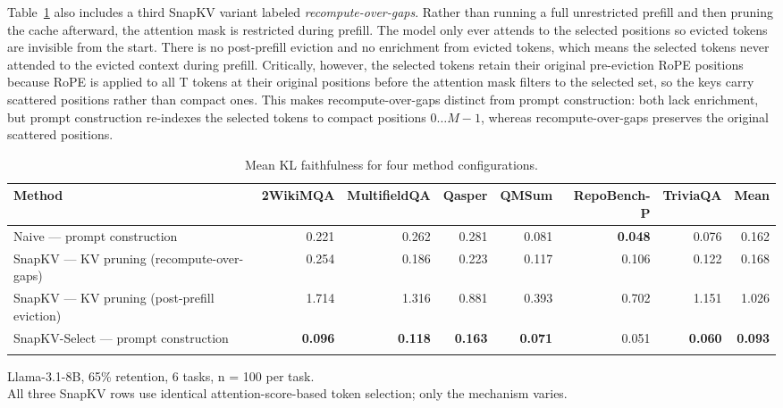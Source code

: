 \documentclass[10pt,letterpaper]{article}
\begin{document}
Table~\ref{tab:t1} also includes a third SnapKV
variant labeled \emph{recompute-over-gaps}. Rather than running a full
unrestricted prefill and then pruning the cache afterward, the attention
mask is restricted during prefill. The model only ever attends to the
selected positions so evicted tokens are invisible from the start.
There is no post-prefill eviction and no enrichment from evicted tokens,
which means the selected tokens never attended to the evicted context during
prefill. Critically, however, the selected tokens retain their original
pre-eviction RoPE positions because RoPE is applied to all T tokens at their
original positions before the attention mask filters to the selected
set, so the keys carry scattered positions rather than compact ones.
This makes recompute-over-gaps distinct from prompt construction: both
lack enrichment, but prompt construction re-indexes the selected tokens
to compact positions \(0 \ldots M-1\), whereas recompute-over-gaps
preserves the original scattered positions.
\begin{table}[H]
\centering
\small
\caption{Mean KL faithfulness for four method configurations.}
\label{tab:t1}
\begin{tabular}{@{}>{\raggedright\arraybackslash}p{}rrrrrrr@{}}
\toprule
Method & 2WikiMQA & MultifieldQA & Qasper & QMSum & RepoBench-P & TriviaQA & Mean\\
\midrule
Naive --- prompt construction & 0.221 & 0.262 & 0.281 & 0.081 & \textbf{0.048} & 0.076 & 0.162\\
SnapKV --- KV pruning (recompute-over-gaps) & 0.254 & 0.186 & 0.223 & 0.117 & 0.106 & 0.122 & 0.168\\
SnapKV --- KV pruning (post-prefill eviction) & 1.714 & 1.316 & 0.881 & 0.393 & 0.702 & 1.151 & 1.026\\
SnapKV-Select --- prompt construction & \textbf{0.096} & \textbf{0.118} & \textbf{0.163} & \textbf{0.071} & 0.051 & \textbf{0.060} & \textbf{0.093}\\
\bottomrule
\\
\end{tabular}
Llama-3.1-8B, 65\% retention, 6 tasks, n = 100 per task.\\All three
SnapKV rows use identical attention-score-based token selection; only
the mechanism varies.
\end{table}
\end{document}
